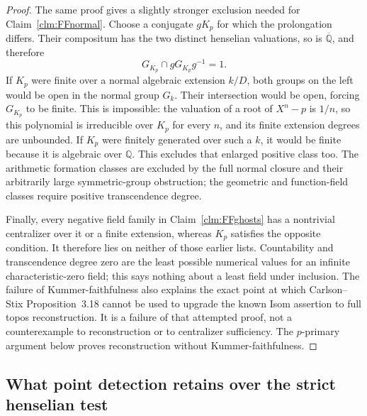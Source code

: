 \begin{proof}
The same proof gives a slightly stronger exclusion needed
for Claim~\ref{clm:FFnormal}. Choose a conjugate
\(gK_p\) for which the prolongation differs. Their
compositum has the two distinct henselian valuations,
so is \(\overline{\mathbb Q}\), and therefore
\[
                   G_{K_p}\cap gG_{K_p}g^{-1}=1.          \tag{FF.23.1}
\]
If \(K_p\) were finite over a normal algebraic extension
\(k/D\), both groups on the left would be open in the
normal group \(G_k\). Their intersection would be open,
forcing \(G_{K_p}\) to be finite. This is impossible:
the valuation of a root of \(X^n-p\) is \(1/n\),
so this polynomial is irreducible over \(K_p\) for every
\(n\), and its finite extension degrees are unbounded.
If \(K_p\) were finitely generated over such a \(k\),
it would be finite because it is algebraic over
\(\mathbb Q\). This excludes that enlarged positive
class too. The arithmetic formation classes are excluded
by the full normal closure and their arbitrarily large
symmetric-group obstruction; the geometric and function-field
classes require positive transcendence degree.

Finally, every negative field family in
Claim~\ref{clm:FFghosts} has a nontrivial centralizer over
it or a finite extension, whereas \(K_p\) satisfies
the opposite condition. It therefore lies on neither
of those earlier lists. Countability and transcendence
degree zero are the least possible numerical values
for an infinite characteristic-zero field; this says
nothing about a least field under inclusion. The failure
of Kummer-faithfulness also explains the exact point at
which Carlson--Stix Proposition~3.18 cannot be used to
upgrade the known Isom assertion to full topos reconstruction.
It is a failure of that attempted proof, not a counterexample
to reconstruction or to centralizer sufficiency. The
\(p\)-primary argument below proves reconstruction
without Kummer-faithfulness.
\end{proof}

\subsection{What point detection retains over the strict henselian test}

